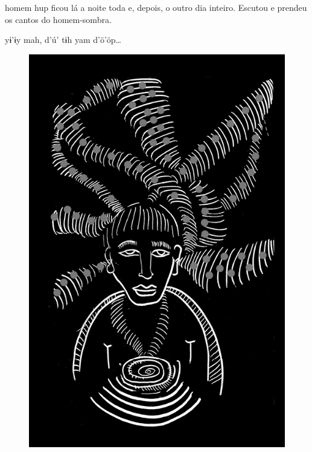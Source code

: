 \chapter*{}

\mbox{}\vspace*{\fill}

 homem hup ficou
lá a noite toda e,
depois, o outro dia
inteiro. Escutou e
prendeu os cantos
do homem-sombra.

\vspace{2em}

 yɨ’ɨy mah,
d’ú’ tɨh yam d’ö’öp\ldots{}

\vspace*{\fill}

\begin{figure}
\vspace*{-2cm}
\hspace*{-2.4cm}\includegraphics[width=142mm]{./imgs/img4.jpg}
\end{figure}

